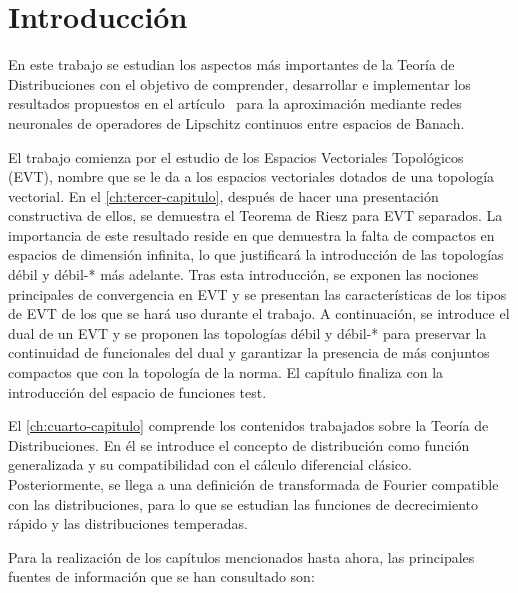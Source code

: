 %


\chapter{Introducción}

En este trabajo se estudian los aspectos más importantes de la Teoría de Distribuciones con el objetivo de comprender, desarrollar e implementar los resultados propuestos en el artículo~\cite{chen1995universal} para la aproximación mediante redes neuronales de operadores de Lipschitz continuos entre espacios de Banach. 


El trabajo comienza por el estudio de los Espacios Vectoriales Topológicos (EVT), nombre que se le da a los espacios vectoriales dotados de una topología vectorial. En el \autoref{ch:tercer-capitulo}, después de hacer una presentación constructiva de ellos, se demuestra el Teorema de Riesz para EVT separados. La importancia de este resultado reside en que demuestra la falta de compactos en espacios de dimensión infinita, lo que justificará la introducción de las topologías débil y débil-* más adelante. Tras esta introducción, se exponen las nociones principales de convergencia en EVT y se presentan las características de los tipos de EVT de los que se hará uso durante el trabajo. A continuación, se introduce el dual de un EVT y se proponen las topologías débil y débil-* para preservar la continuidad de funcionales del dual y garantizar la presencia de más conjuntos compactos que con la topología de la norma. El capítulo finaliza con la introducción del espacio de funciones test. 

El \autoref{ch:cuarto-capitulo} comprende los contenidos trabajados sobre la Teoría de Distribuciones. En él se introduce el concepto de distribución como función generalizada y su compatibilidad con el cálculo diferencial clásico. Posteriormente, se llega a una definición de transformada de Fourier compatible con las distribuciones, para lo que se estudian las funciones de decrecimiento rápido y las distribuciones temperadas. 

Para la realización de los capítulos mencionados hasta ahora, las principales fuentes de información que se han consultado son: 

